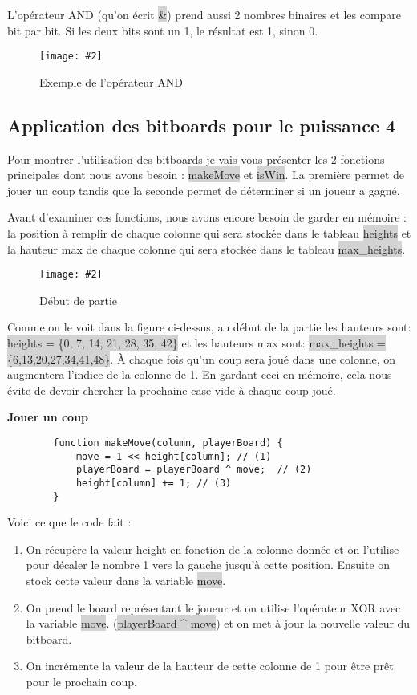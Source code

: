 \documentclass[a4paper]{article}
\newcommand{\img}[3][]{
    \begin{figure}[H]
        \centering
        \texttt{[image: \#2]}
        \caption{#1}    
    \end{figure}
}
\newcommand{\inlinecode}[1]{\colorbox{lightgray}{#1}}
\newcommand{\ptitle}[1]{\vspace{10pt}
{\large \noindent \textbf{#1}}}
\begin{document}
    L'opérateur AND (qu'on écrit \inlinecode{\&}) prend aussi 2 nombres binaires et les compare bit par bit. Si les deux bits sont un 1, le résultat est 1, sinon 0.
    \img[Exemple de l'opérateur AND]{Images/ANDExemple.png}{0.15}

\subsection{Application des bitboards pour le puissance 4}

    Pour montrer l'utilisation des bitboards je vais vous présenter les 2 fonctions principales dont nous avons besoin : \inlinecode{makeMove} et \inlinecode{isWin}. La première permet de jouer un coup tandis que la seconde permet de déterminer si un joueur a gagné.

    Avant d'examiner ces fonctions, nous avons encore besoin de garder en mémoire : la position à remplir de chaque colonne qui sera stockée dans le tableau \inlinecode{heights} et la hauteur max de chaque colonne qui sera stockée dans le tableau \inlinecode{max\_heights}.

    \img[Début de partie]{Images/EmptyBoard.png}{0.4}

    Comme on le voit dans la figure ci-dessus, au début de la partie les hauteurs sont: \newline\inlinecode{heights = \{0, 7, 14, 21, 28, 35, 42\}} et les hauteurs max sont: \inlinecode{max\_heights = \{6,13,20,27,34,41,48\}}. À chaque fois qu'un coup sera joué dans une colonne, on augmentera l'indice de la colonne de 1. En gardant ceci en mémoire, cela nous évite de devoir chercher la prochaine case vide à chaque coup joué.

    \ptitle{Jouer un coup}

    \begin{lstlisting}
        function makeMove(column, playerBoard) {
            move = 1 << height[column]; // (1)
            playerBoard = playerBoard ^ move;  // (2)
            height[column] += 1; // (3)
        }
    \end{lstlisting}
    Voici ce que le code fait : 
    \begin{enumerate}
        \item On récupère la valeur height en fonction de la colonne donnée et on l'utilise pour décaler le nombre 1 vers la gauche jusqu'à cette position. Ensuite on stock cette valeur dans la variable \inlinecode{move}.
        \item On prend le board représentant le joueur et on utilise l'opérateur XOR avec la variable \inlinecode{move}. (\inlinecode{playerBoard \^{} move}) et on met à jour la nouvelle valeur du bitboard.
        \item On incrémente la valeur de la hauteur de cette colonne de 1 pour être prêt pour le prochain coup.
    \end{enumerate}
\end{document}

